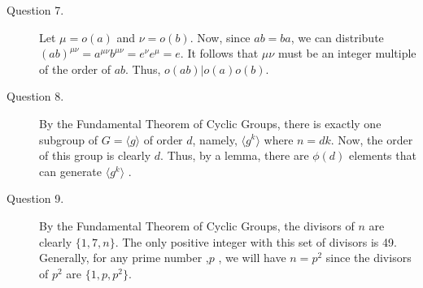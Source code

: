 \documentclass[]{article}
\begin{document}
\begin{description}
\item[Question 7. ] Let $\mu = o(a)$ and $\nu = o(b)$. Now, since $ab = ba$, we can distribute $(ab)^{\mu\nu} = a^{\mu\nu}b^{\mu\nu} = e^{\nu}e^{\mu} = e$. It follows that $\mu\nu$ must be an integer multiple of the order of $ab$. Thus, $o(ab) | o(a)o(b)$. 
\item[Question 8. ] By the Fundamental Theorem of Cyclic Groups, there is exactly one subgroup of $G = \langle g \rangle$ of order $d$, namely, $\langle g^{k} \rangle$ where $n = dk$. Now, the order of this group is clearly $d$. Thus, by a lemma, there are $\phi(d)$ elements that can generate $\langle g^k \rangle $ .
\item[Question 9.] By the Fundamental Theorem of Cyclic Groups, the divisors of $n$ are clearly $\{1,7,n\}$. The only positive integer with this set of divisors is 49. Generally, for any prime number ,$p$ , we will have $n = p^2$ since the divisors of $p^2$ are $\{1,p,p^2\}$.
\end{description}
\end{document}
